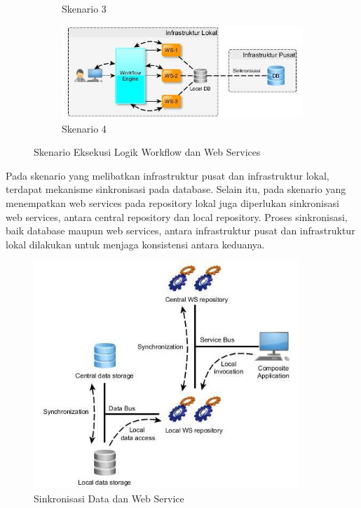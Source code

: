 \begin{figure}[h]
\begin{subfigure}[b]{.5\textwidth}
  		\caption{Skenario 3}
  		\label{fig:design-workflow-webservice-3}
	\end{subfigure}%
	\begin{subfigure}[b]{.5\textwidth}
  		\centering
  		\includegraphics[width=1\linewidth]{../../Resources/Images/takdir-design-4}
  		\caption{Skenario 4}
  		\label{fig:design-workflow-webservice-4}
	\end{subfigure}
    \caption{Skenario Eksekusi Logik Workflow dan Web Services}
    \label{fig:design-workflow-webservice}
\end{figure}

Pada skenario yang melibatkan infrastruktur pusat dan infrastruktur lokal, terdapat mekanisme sinkronisasi pada database. Selain itu, pada skenario yang menempatkan web services pada repository lokal juga diperlukan sinkronisasi web services, antara central repository dan local repository. Proses sinkronisasi, baik database maupun web services, antara infrastruktur pusat dan infrastruktur lokal dilakukan untuk menjaga konsistensi antara keduanya.

\begin{figure}[h]
    \centering
    \includegraphics[width=10cm]{../../Resources/Images/takdir-synchronize}
    \caption{Sinkronisasi Data dan Web Service}
    \label{fig:syncronize}
\end{figure}

